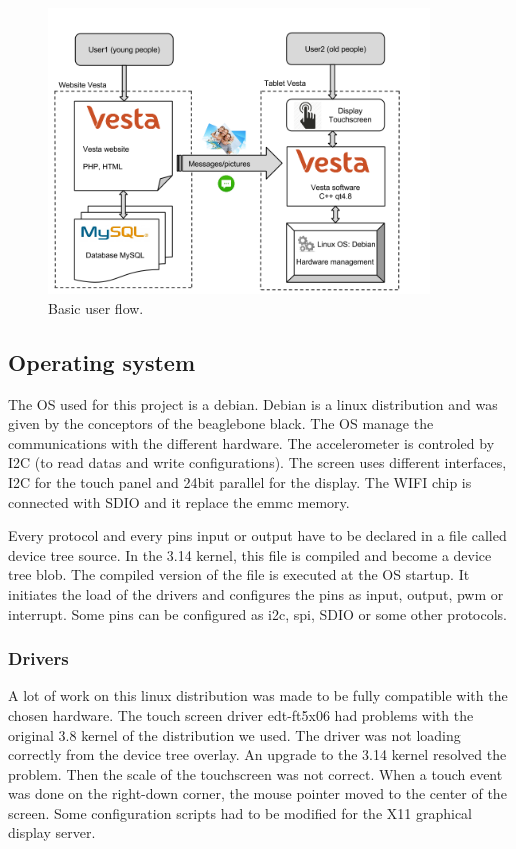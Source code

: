 \begin{figure}[!htb]
    \centering
    \includegraphics[width=0.9\textwidth,keepaspectratio]{chap/softFig/block_diagram_vesta2.png}
    \caption{Basic user flow.}
    \label{fig:user flow}
\end{figure}

\subsection{Operating system}
The OS used for this project is a debian. Debian is a linux distribution and was given by the conceptors of the beaglebone black. The OS manage the communications with the different hardware. The accelerometer is controled by I2C (to read datas and write configurations). The screen uses different interfaces, I2C for the touch panel and 24bit parallel for the display. The WIFI chip is connected with SDIO and it replace the emmc memory.

Every protocol and every pins input or output have to be declared in a file called device tree source. In the 3.14 kernel, this file is compiled and become a device tree blob. The compiled version of the file is executed at the OS startup. It initiates the load of the drivers and configures the pins as input, output, pwm or interrupt. Some pins can be configured as i2c, spi, SDIO or some other protocols.

\subsubsection{Drivers}
A lot of work on this linux distribution was made to be fully compatible with the chosen hardware.
The touch screen driver edt-ft5x06 had problems with the original 3.8 kernel of the distribution we used. The driver was not loading correctly from the device tree overlay. An upgrade to the 3.14 kernel resolved the problem.
Then the scale of the touchscreen was not correct. 
When a touch event was done on the right-down corner, the mouse pointer moved to the center of the screen. Some configuration scripts had to be modified for the X11 graphical display server.

